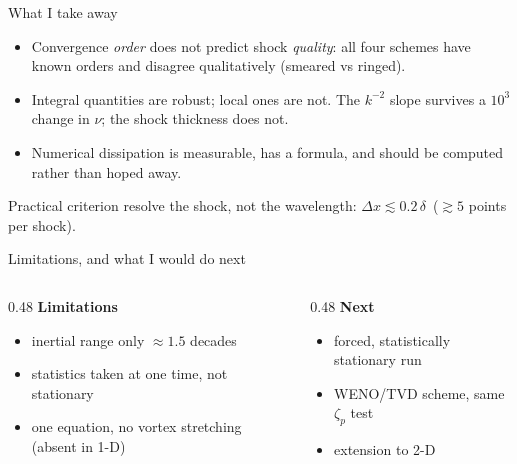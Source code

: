 \documentclass[aspectratio=169,10pt]{beamer}
\begin{document}
\begin{frame}{What I take away}
  \begin{itemize}
    \item Convergence \emph{order} does not predict shock \emph{quality}:
          all four schemes have known orders and disagree qualitatively
          (smeared vs ringed).
    \item Integral quantities are robust; local ones are not. The $k^{-2}$
          slope survives a $10^3$ change in $\nu$; the shock thickness does not.
    \item Numerical dissipation is measurable, has a formula, and should be
          computed rather than hoped away.
  \end{itemize}
  \vspace{3mm}
  \begin{block}{Practical criterion}
    \centering
    resolve the shock, not the wavelength: $\Delta x \lesssim 0.2\,\delta$
    \;\,($\gtrsim 5$ points per shock).
  \end{block}
\end{frame}

\begin{frame}{Limitations, and what I would do next}
  \begin{columns}[T]
    \begin{column}{0.48\textwidth}
      \textbf{Limitations}
      \begin{itemize}
        \item inertial range only $\approx1.5$ decades
        \item statistics taken at one time, not stationary
        \item one equation, no vortex stretching (absent in 1-D)
      \end{itemize}
    \end{column}
    \begin{column}{0.48\textwidth}
      \textbf{Next}
      \begin{itemize}
        \item forced, statistically stationary run
        \item WENO/TVD scheme, same $\zeta_p$ test
        \item extension to 2-D
      \end{itemize}
    \end{column}
  \end{columns}
\end{frame}
\end{document}

